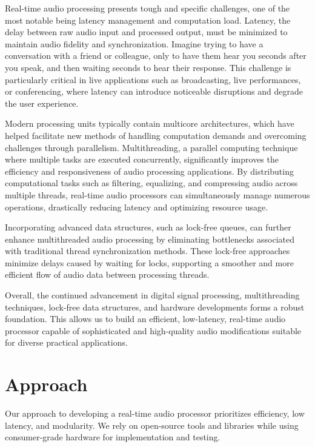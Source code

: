 \documentclass[conference]{IEEEtran}
\begin{document}
Real-time audio processing presents tough and specific challenges, one of the most notable being latency management and computation load. Latency, the delay between raw audio input and processed output, must be minimized to maintain audio fidelity and synchronization. Imagine trying to have a conversation with a friend or colleague, only to have them hear you seconds after you speak, and then waiting seconds to hear their response. This challenge is particularly critical in live applications such as broadcasting, live performances, or conferencing, where latency can introduce noticeable disruptions and degrade the user experience.

Modern processing units typically contain multicore architectures, which have helped facilitate new methods of handling computation demands and overcoming challenges through parallelism. Multithreading, a parallel computing technique where multiple tasks are executed concurrently, significantly improves the efficiency and responsiveness of audio processing applications. By distributing computational tasks such as filtering, equalizing, and compressing audio across multiple threads, real-time audio processors can simultaneously manage numerous operations, drastically reducing latency and optimizing resource usage.

Incorporating advanced data structures, such as lock-free queues, can further enhance multithreaded audio processing by eliminating bottlenecks associated with traditional thread synchronization methods. These lock-free approaches minimize delays caused by waiting for locks, supporting a smoother and more efficient flow of audio data between processing threads.

Overall, the continued advancement in digital signal processing, multithreading techniques, lock-free data structures, and hardware developments forms a robust foundation. This allows us to build an efficient, low-latency, real-time audio processor capable of sophisticated and high-quality audio modifications suitable for diverse practical applications.


\section{Approach}

Our approach to developing a real-time audio processor prioritizes efficiency, low latency, and modularity. We rely on open-source tools and libraries while using consumer-grade hardware for implementation and testing.
\end{document}

